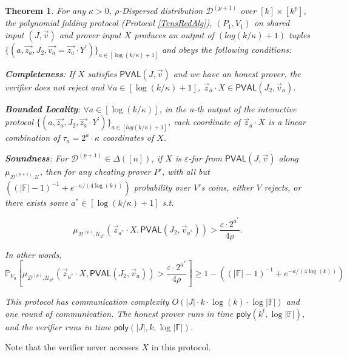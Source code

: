 \documentclass[10pt,a4paper]{article}
\newtheorem{theorem}{Theorem}[section]
\newcommand{\poly}{\mathsf{poly}}
\newcommand{\PVAL}{\mathsf{PVAL}}
\newcommand{\F}{\mathbb{F}}
\newcommand{\sD}{\mathcal{D}}
\begin{document}
\begin{theorem}
\label{TensRed}
For any $\kappa>0$, $\rho$-Dispersed distribution $\sD^{(p+1)} $ over $[k]\times [k^{p}]$, the polynomial folding protocol (Protocol \ref{TensRedAlg}), $(P_{1}, V_{1})$ on shared input  $(J, \vec{v})$ and prover input $X$ produces an output of $(log(k/\kappa) + 1)$ tuples $\{(a, \vec{z_{a}}, J_{2}, \vec{v_{a}}=\vec{z_{a}}\cdot  Y^\prime)\}_{a\in[\log(k/\kappa)+1]}$ and obeys the following conditions: 

\textbf{Completeness}: If $X$ satisfies $\PVAL(J,\vec{v})$ and we have an honest prover, the verifier does not reject and $\forall a\in [\log(k/\kappa)+1]$, $\Vec{z}_{a}\cdot X\in\PVAL(J_{2},\vec{v}_{a})$. 
\newline

\textbf{Bounded Locality}: $\forall a\in [\log(k/\kappa)]$, in the a-th output of the interactive protocol $\{(a, \vec{z_{a}}, J_{2}, \vec{z_{a}}\cdot  Y^\prime)\}_{a\in[log(k/\kappa)+1]}$, each coordinate of $\Vec{z}_{a}\cdot X$ is a linear combination of $\tau_{a}=2^{a}\cdot \kappa$ coordinates of $X$.
\newline

\textbf{Soundness}:  For $\sD^{(p+1)}\in \Delta([n])$, if $X$ is $\varepsilon$-far from $\PVAL(J, \vec{v})$ along $\mu_{\mathcal{D}^{(p+1)},\mathcal{U}}$, then for any cheating prover $P'$, with all but $((\vert \F\vert -1)^{-1} + e^{-\kappa/(4 \log (k))})$ probability over $V'$s coins, either $V$ rejects, or there exists some $a^{\ast}\in [\log(k/\kappa) + 1]$ s.t. 

\begin{equation*}\mu_{\mathcal{D}^{(p)}, \mathcal{U}_{k^{p}}}(\Vec{z}_{a^{\ast}}\cdot X,\PVAL(J_{2}, \vec{v}_{a^{\ast}}))>\frac{\varepsilon \cdot 2^{a^{\ast}}}{4\rho}.
\end{equation*}

In other words,
\begin{equation*}
    \mathbb{P}_{V_{0}}\left[\mu_{\mathcal{D}^{(p)}, \mathcal{U}_{k^{p}}}(\Vec{z}_{a^{\ast}}\cdot X,\PVAL(J_{2}, \vec{v}_{a}))>\frac{\varepsilon \cdot 2^{a^{\ast}}}{4\rho}\right]\geq 1-((\vert \F\vert -1)^{-1} + e^{-\kappa/(4 \log (k))})
\end{equation*}

This protocol has communication complexity $O(\vert J\vert  \cdot  k \cdot \log (k) \cdot \log \vert \F\vert )$ and one round of communication. The honest prover runs in time $\poly(k^{t}, \log \vert \F\vert )$, and the verifier runs in time $\poly(\vert J\vert, k, \log \vert \F\vert )$.  
\end{theorem}
\noindent Note that the verifier never accesses $X$ in this protocol. 
\end{document}
